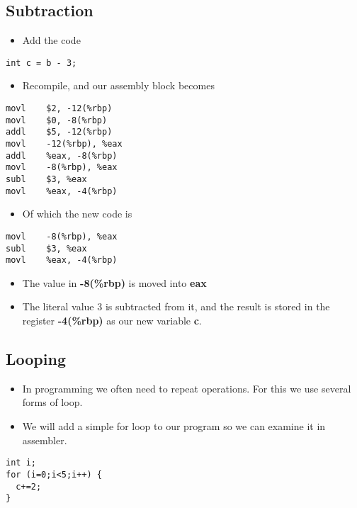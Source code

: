 \documentclass[minimal, t]{article}
\begin{document}
\subsection{Subtraction}
\label{sec-1-1}
\begin{itemize}
\item Add the code
\end{itemize}
\begin{verbatim}
int c = b - 3;
\end{verbatim}
\begin{itemize}
\item Recompile, and our assembly block becomes
\end{itemize}
\begin{verbatim}
movl    $2, -12(%rbp)
movl    $0, -8(%rbp)
addl    $5, -12(%rbp)
movl    -12(%rbp), %eax
addl    %eax, -8(%rbp)
movl    -8(%rbp), %eax
subl    $3, %eax
movl    %eax, -4(%rbp)
\end{verbatim}
\begin{itemize}
\item Of which the new code is
\end{itemize}
\begin{verbatim}
movl    -8(%rbp), %eax
subl    $3, %eax
movl    %eax, -4(%rbp)
\end{verbatim}
\begin{itemize}
\item The value in \textbf{-8(\%rbp)} is moved into \textbf{eax}
\item The literal value 3 is subtracted from it, and the result is stored
in the register \textbf{-4(\%rbp)} as our new variable \textbf{c}.
\end{itemize}
\subsection{Looping}
\label{sec-1-2}
\begin{itemize}
\item In programming we often need to repeat operations. For this we use
several forms of loop.
\item We will add a simple for loop to our program so we can examine it
in assembler.
\end{itemize}
\begin{verbatim}
int i;                                                                                                    
for (i=0;i<5;i++) {                                      
  c+=2;                                       
}
\end{verbatim}
\end{document}
